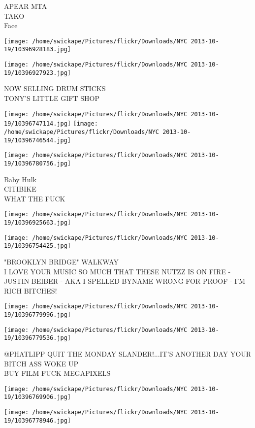 \documentclass[10pt,letterpaper]{article}
\begin{document}
APEAR MTA\\
TAKO\\
Face
\pagebreak

\texttt{[image: /home/swickape/Pictures/flickr/Downloads/NYC 2013-10-19/10396928183.jpg]}

\vspace{0.25in}
\texttt{[image: /home/swickape/Pictures/flickr/Downloads/NYC 2013-10-19/10396927923.jpg]}

NOW SELLING DRUM STICKS\\
TONY'S LITTLE GIFT SHOP
\pagebreak

\texttt{[image: /home/swickape/Pictures/flickr/Downloads/NYC 2013-10-19/10396747114.jpg]}
\texttt{[image: /home/swickape/Pictures/flickr/Downloads/NYC 2013-10-19/10396746544.jpg]}

\texttt{[image: /home/swickape/Pictures/flickr/Downloads/NYC 2013-10-19/10396780756.jpg]}

Baby Hulk\\
CITIBIKE\\
WHAT THE FUCK
\pagebreak

\texttt{[image: /home/swickape/Pictures/flickr/Downloads/NYC 2013-10-19/10396925663.jpg]}

\vspace{0.25in}
\texttt{[image: /home/swickape/Pictures/flickr/Downloads/NYC 2013-10-19/10396754425.jpg]}

"BROOKLYN BRIDGE" WALKWAY\\
I LOVE YOUR MUSIC SO MUCH THAT THESE NUTZZ IS ON FIRE {-} JUSTIN BEIBER {-} AKA I SPELLED BYNAME WRONG FOR PROOF {-} I'M RICH BITCHES!
\pagebreak

\texttt{[image: /home/swickape/Pictures/flickr/Downloads/NYC 2013-10-19/10396779996.jpg]}

\vspace{0.25in}
\texttt{[image: /home/swickape/Pictures/flickr/Downloads/NYC 2013-10-19/10396779536.jpg]}

@PHATLIPP QUIT THE MONDAY SLANDER!...IT'S ANOTHER DAY YOUR BITCH ASS WOKE UP\\
BUY FILM FUCK MEGAPIXELS
\pagebreak

\texttt{[image: /home/swickape/Pictures/flickr/Downloads/NYC 2013-10-19/10396769906.jpg]}

\vspace{0.25in}
\texttt{[image: /home/swickape/Pictures/flickr/Downloads/NYC 2013-10-19/10396778946.jpg]}
\end{document}
